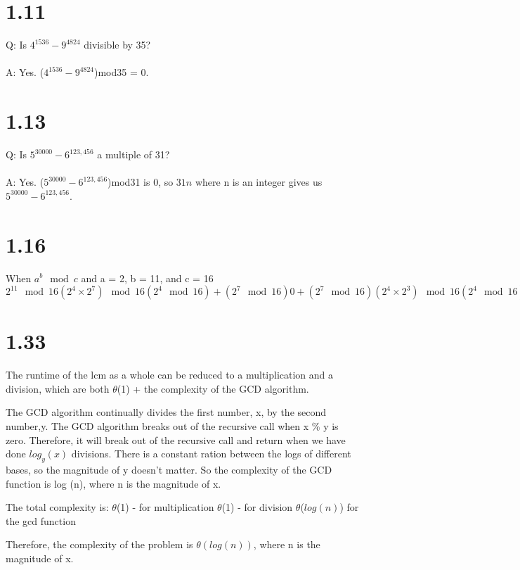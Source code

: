 \documentclass[12pt]{article}
\begin{document}
\section*{1.11}
Q: Is $4^{1536}-9^{4824}$ divisible by 35?
\\
\\
A: Yes. ($4^{1536}-9^{4824}$)mod35 = 0.

\section*{1.13}
Q: Is $5^{30000} - 6^{123,456}$ a multiple of 31?
\\
\\
A: Yes. ($5^{30000} - 6^{123,456}$)mod31 is 0, so $31n$ where n is an integer gives us $5^{30000} - 6^{123,456}$.

\section*{1.16}

When $a^{b}\mod{c}$ and a = 2, b = 11, and c = 16
$
2^{11} \mod{16}
(2^{4} \times 2^{7}) \mod{16} 
(2^{4} \mod{16}) + (2^{7} \mod{16})
0 + (2^{7} \mod{16})
(2^{4} \times 2^{3}) \mod{16}
(2^{4} \mod{16}) + (2^{3} \mod{16})
0 + (2^{3} \mod{16})
8 \mod{16}
$

\section*{1.33}


The runtime of the lcm as a whole can be reduced to a multiplication and a division, which are both $\theta$(1) + the complexity of the GCD algorithm.

The GCD algorithm continually divides the first number, x, by the second number,y. The GCD algorithm breaks out of the recursive call when x \% y is zero. Therefore, it will break out of the recursive call and return when we have done $log_y(x)$ divisions. There is a constant ration between the logs of different bases, so the magnitude of y doesn't matter. So the complexity of the GCD function is log (n), where n is the magnitude of x.

The total complexity is:
$\theta$(1) - for multiplication
$\theta$(1) - for division
$\theta$($log(n)$) for the gcd function

Therefore, the complexity of the problem is $\theta(log(n))$, where n is the magnitude of x.
\\
\end{document}
